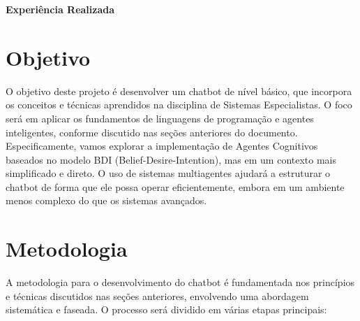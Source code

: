 \documentclass[12pt]{article}
\begin{document}
    \vspace{10mm} 
    \begin{center} 
    \Large 
    \textbf{Experiência Realizada} 
    \end{center} 

    \setcounter{section}{0}
    \section{Objetivo}

    O objetivo deste projeto é desenvolver um chatbot de nível básico, que incorpora os conceitos e técnicas aprendidos na disciplina de Sistemas Especialistas. O foco será em aplicar os fundamentos de linguagens de programação e agentes inteligentes, conforme discutido nas seções anteriores do documento. Especificamente, vamos explorar a implementação de Agentes Cognitivos baseados no modelo BDI (Belief-Desire-Intention), mas em um contexto mais simplificado e direto. O uso de sistemas multiagentes ajudará a estruturar o chatbot de forma que ele possa operar eficientemente, embora em um ambiente menos complexo do que os sistemas avançados.


    \section{Metodologia}

    A metodologia para o desenvolvimento do chatbot é fundamentada nos princípios e técnicas discutidos nas seções anteriores, envolvendo uma abordagem sistemática e faseada. O processo será dividido em várias etapas principais:
\end{document}
